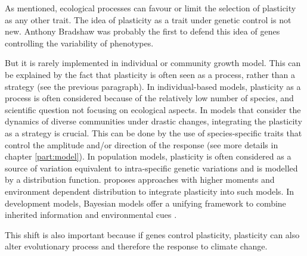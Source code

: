 As mentioned, ecological processes can favour or limit the selection of plasticity as any other trait. The idea of plasticity as a trait under genetic control is not new. Anthony Bradshaw was probably the first to defend this idea of genes controlling the variability of phenotypes. 

But it is rarely implemented in individual or community growth model. This can be explained by the fact that plasticity is often seen as a process, rather than a strategy (see the previous paragraph). In individual-based models, plasticity as a process is often considered because of the relatively low number of species, and scientific question not focusing on ecological aspects. In models that consider the dynamics of diverse communities under drastic changes, integrating the plasticity as a strategy is crucial. This can be done by the use of species-specific traits that control the amplitude and/or direction of the response (see more details in chapter \ref{part:model}). In population models, plasticity is often considered as a source of variation equivalent to intra-specific genetic variations and is modelled by a distribution function. \cite{dewitt_expanding_2016} proposes approaches with higher moments and environment dependent distribution to integrate plasticity into such models. In development models, Bayesian models offer a unifying framework to combine inherited information and environmental cues \parencite{stamps_bayesian_2016}.


This shift is also important because if genes control plasticity, plasticity can also alter evolutionary process and therefore the response to climate change\cite{pfennig_phenotypic_2010, matesanz_global_2010, nicotra_plant_2010}.




